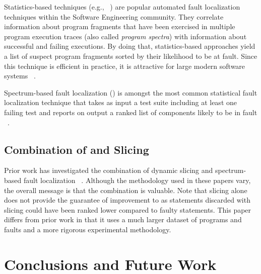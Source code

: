 \documentclass{article}
\begin{document}
Statistics-based techniques (e.g., ~\cite{Pearson:2017:EIF:3097368.3097441}) are
popular automated fault localization techniques within the Software Engineering
community. They correlate information about program fragments that have been
exercised in multiple program execution traces (also called \textit{program
spectra}) with information about successful and failing executions. By doing
that, statistics-based approaches yield a list of suspect program fragments
sorted by their likelihood to be at fault. Since this technique is efficient in
practice, it is attractive for large modern software systems ~\cite{Zoeteweij:2007:DES:1251988.1253298}.

Spectrum-based fault localization (\sfl{}) is amongst the most common statistical
fault localization technique that takes as input a test suite including at least
one failing test and reports on output a ranked list of components likely to be
in fault ~\cite{FLSurvey2016,DBLP:conf/kbse/JonesH05,DBLP:journals/smr/LuciaLJTB14,DBLP:journals/jss/AbreuZGG09}.

\subsection{Combination of \sfl{} and Slicing}

Prior work has investigated the combination of dynamic slicing and
spectrum-based fault
localization ~\cite{Wotawa:2010:FLB:1848650.1849235,Alves:2011:FUD:2190078.2190115,DBLP:conf/ecai/HoferW12,lei-mao-dai-wang-2012,slicing-sfl-repair}. Although
the methodology used in these papers vary, the overall message is that
the combination is valuable. Note that slicing alone does not provide
the guarantee of improvement to \sfl{} as statements discarded with
slicing could have been ranked lower compared to faulty
statements. This paper differs from prior work in that it uses a much
larger dataset of programs and faults and a more rigorous experimental
methodology.


\section{Conclusions and Future Work}\label{sec:conc}



\end{document}
